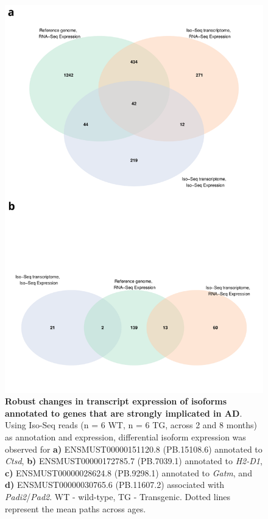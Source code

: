 \begin{figure}[!htp]
	\centering
	\includegraphics[page=18,scale = 0.55]{Figures/WholeDifferentialAnalysis.pdf}
	\captionsetup{width=0.95\textwidth}
	\caption[Robust changes in transcript expression of isoforms annotated to genes that are strongly implicated in AD]%
	{\textbf{Robust changes in transcript expression of isoforms annotated to genes that are strongly implicated in AD}. Using Iso-Seq reads (n = 6 WT, n = 6 TG, across 2 and 8 months) as annotation and expression, differential isoform expression was observed for \textbf{a)} ENSMUST00000151120.8 (PB.15108.6) annotated to \textit{Ctsd}, \textbf{b)} ENSMUST00000172785.7 (PB.7039.1) annotated to \textit{H2-D1}, \textbf{c)} ENSMUST00000028624.8 (PB.9298.1) annotated to \textit{Gatm}, and \textbf{d)} ENSMUST00000030765.6 (PB.11607.2) associated with \textit{Padi2}/\textit{Pad2}.  WT - wild-type, TG - Transgenic. Dotted lines represent the mean paths across ages.}    
	\label{fig:DEI_ADgenes_isoseq}
\end{figure}

